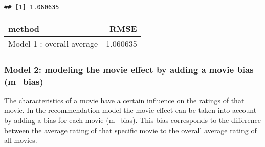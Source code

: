 \documentclass[
]{article}
\newenvironment{Shaded}{\begin{snugshade}}{\end{snugshade}}
\newcommand{\DataTypeTok}[1]{\textcolor[rgb]{0.13,0.29,0.53}{#1}}
\newcommand{\DecValTok}[1]{\textcolor[rgb]{0.00,0.00,0.81}{#1}}
\newcommand{\KeywordTok}[1]{\textcolor[rgb]{0.13,0.29,0.53}{\textbf{#1}}}
\newcommand{\NormalTok}[1]{#1}
\newcommand{\OperatorTok}[1]{\textcolor[rgb]{0.81,0.36,0.00}{\textbf{#1}}}
\newcommand{\StringTok}[1]{\textcolor[rgb]{0.31,0.60,0.02}{#1}}
\begin{document}
\begin{verbatim}
## [1] 1.060635
\end{verbatim}

\begin{Shaded}
\end{Shaded}

\begin{longtable}[]{@{}lr@{}}
\toprule
method & RMSE\tabularnewline
\midrule
\endhead
Model 1 : overall average & 1.060635\tabularnewline
\bottomrule
\end{longtable}

\hypertarget{model-2-modeling-the-movie-effect-by-adding-a-movie-bias-m_bias}{%
\subsubsection{Model 2: modeling the movie effect by adding a movie bias
(m\_bias)}\label{model-2-modeling-the-movie-effect-by-adding-a-movie-bias-m_bias}}

The characteristics of a movie have a certain influence on the ratings
of that movie. In the recommendation model the movie effect can be taken
into account by adding a bias for each movie (m\_bias). This bias
corresponds to the difference between the average rating of that
specific movie to the overall average rating of all movies.
\end{document}
